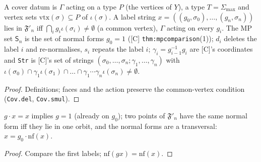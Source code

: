 \begin{definition}\label{def:mp-cover}
  \leanok
  A cover datum is $\Gamma$ acting on a type $P$ (the vertices of $Y$), a type $T=\Sigma_{\max}$ and vertex sets
  $\mathrm{vtx}(\sigma)\subseteq P$ of $\iota(\sigma)$.  A label string $x=((g_0,\sigma_0),\dots,(g_n,\sigma_n))$ lies in
  $\mathfrak F'_n$ iff $\bigcap_ig_i\iota(\sigma_i)\ne\emptyset$ (a common vertex), $\Gamma$ acting on every $g_i$.  The MP set
  $\mathsf S_n$ is the set of normal forms $g_0=1$ ([C] \texttt{thm:mpcomparison}(1)); $d_i$ deletes the label $i$ and
  re-normalises, $s_i$ repeats the label $i$; $\gamma_i=g_{i-1}^{-1}g_i$ are [C]'s coordinates and \texttt{Str} is [C]'s set of
  strings $(\sigma_0,\dots,\sigma_n;\gamma_1,\dots,\gamma_n)$ with $\iota(\sigma_0)\cap\gamma_1\iota(\sigma_1)\cap\dots\cap
  \gamma_1\cdots\gamma_n\iota(\sigma_n)\ne\emptyset$.
\end{definition}
\begin{proof}
  \leanok
  Definitions; faces and the action preserve the common-vertex condition (\texttt{Cov.del}, \texttt{Cov.smul}).
\end{proof}

\begin{lemma}\label{lem:mp-free}
  \leanok
  $g\cdot x=x$ implies $g=1$ (already on $g_0$); two points of $\mathfrak F'_n$ have the same normal form iff they lie in one orbit,
  and the normal forms are a transversal: $x=g_0\cdot\mathrm{nf}(x)$.
\end{lemma}
\begin{proof}
  \leanok
  Compare the first labels; $\mathrm{nf}(gx)=\mathrm{nf}(x)$.
\end{proof}

